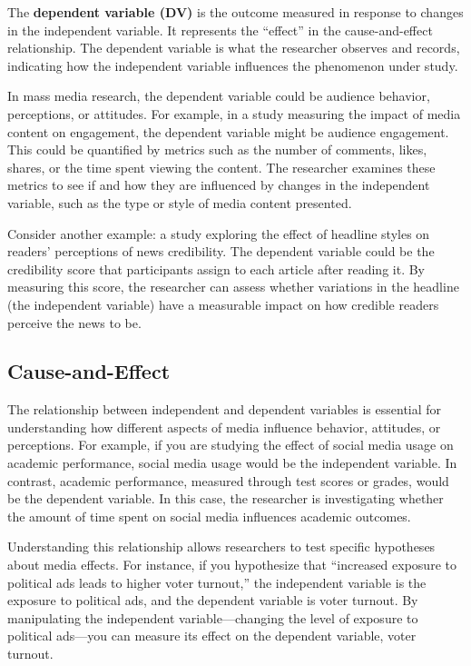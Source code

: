 \documentclass[
]{book}
\begin{document}
The \textbf{dependent variable (DV)} is the outcome measured in response to changes in the independent variable. It represents the ``effect'' in the cause-and-effect relationship. The dependent variable is what the researcher observes and records, indicating how the independent variable influences the phenomenon under study.

In mass media research, the dependent variable could be audience behavior, perceptions, or attitudes. For example, in a study measuring the impact of media content on engagement, the dependent variable might be audience engagement. This could be quantified by metrics such as the number of comments, likes, shares, or the time spent viewing the content. The researcher examines these metrics to see if and how they are influenced by changes in the independent variable, such as the type or style of media content presented.

Consider another example: a study exploring the effect of headline styles on readers' perceptions of news credibility. The dependent variable could be the credibility score that participants assign to each article after reading it. By measuring this score, the researcher can assess whether variations in the headline (the independent variable) have a measurable impact on how credible readers perceive the news to be.

\subsection*{Cause-and-Effect}\label{cause-and-effect}

The relationship between independent and dependent variables is essential for understanding how different aspects of media influence behavior, attitudes, or perceptions. For example, if you are studying the effect of social media usage on academic performance, social media usage would be the independent variable. In contrast, academic performance, measured through test scores or grades, would be the dependent variable. In this case, the researcher is investigating whether the amount of time spent on social media influences academic outcomes.

Understanding this relationship allows researchers to test specific hypotheses about media effects. For instance, if you hypothesize that ``increased exposure to political ads leads to higher voter turnout,'' the independent variable is the exposure to political ads, and the dependent variable is voter turnout. By manipulating the independent variable---changing the level of exposure to political ads---you can measure its effect on the dependent variable, voter turnout.
\end{document}
